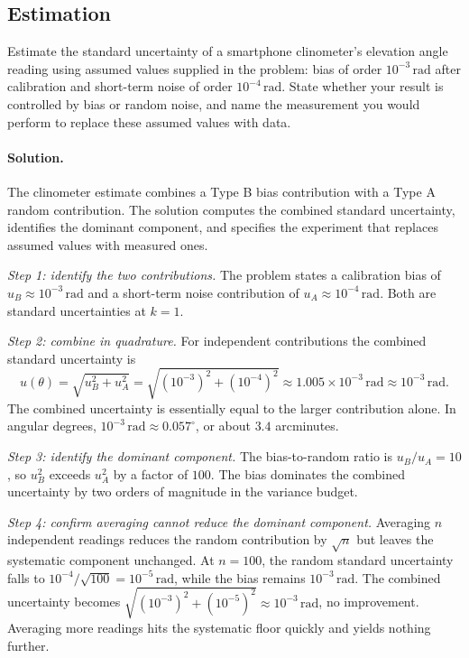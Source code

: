 \subsection*{Estimation}

\begin{exercise}
Estimate the standard uncertainty of a smartphone clinometer's
elevation angle reading using assumed values supplied in the
problem: bias of order $10^{-3} \,\si{\radian}$ after calibration
and short-term noise of order $10^{-4} \,\si{\radian}$. State
whether your result is controlled by bias or random noise, and name
the measurement you would perform to replace these assumed values
with data.
\end{exercise}

\paragraph{Solution.}
The clinometer estimate combines a Type B bias contribution with a
Type A random contribution. The solution computes the combined
standard uncertainty, identifies the dominant component, and
specifies the experiment that replaces assumed values with measured
ones.

\emph{Step 1: identify the two contributions.} The problem states
a calibration bias of $u_{B} \approx 10^{-3}\,\si{\radian}$ and a
short-term noise contribution of $u_{A} \approx 10^{-4}\,\si{
\radian}$. Both are standard uncertainties at $k = 1$.

\emph{Step 2: combine in quadrature.} For independent
contributions the combined standard uncertainty is
\[
u(\theta) = \sqrt{u_{B}^{2} + u_{A}^{2}} = \sqrt{(10^{-3})^{2} +
(10^{-4})^{2}} \approx 1.005 \times 10^{-3}\,\si{\radian} \approx
10^{-3}\,\si{\radian}.
\]
The combined uncertainty is essentially equal to the larger
contribution alone. In angular degrees, $10^{-3}\,\si{\radian}
\approx 0.057^{\circ}$, or about $3.4$ arcminutes.

\emph{Step 3: identify the dominant component.} The bias-to-random
ratio is $u_{B}/u_{A} = 10$, so $u_{B}^{2}$ exceeds $u_{A}^{2}$ by
a factor of $100$. The bias dominates the combined uncertainty by
two orders of magnitude in the variance budget.

\emph{Step 4: confirm averaging cannot reduce the dominant
component.} Averaging $n$ independent readings reduces the random
contribution by $\sqrt{n}$ but leaves the systematic component
unchanged. At $n = 100$, the random standard uncertainty falls to
$10^{-4}/\sqrt{100} = 10^{-5}\,\si{\radian}$, while the bias
remains $10^{-3}\,\si{\radian}$. The combined uncertainty becomes
$\sqrt{(10^{-3})^{2} + (10^{-5})^{2}} \approx 10^{-3}\,\si{\radian}$,
no improvement. Averaging more readings hits the systematic floor
quickly and yields nothing further.

